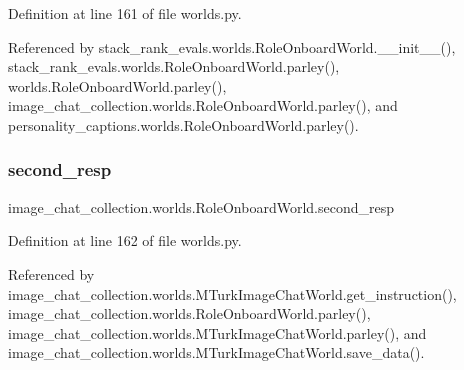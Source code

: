 Definition at line 161 of file worlds.\+py.



Referenced by stack\+\_\+rank\+\_\+evals.\+worlds.\+Role\+Onboard\+World.\+\_\+\+\_\+init\+\_\+\+\_\+(), stack\+\_\+rank\+\_\+evals.\+worlds.\+Role\+Onboard\+World.\+parley(), worlds.\+Role\+Onboard\+World.\+parley(), image\+\_\+chat\+\_\+collection.\+worlds.\+Role\+Onboard\+World.\+parley(), and personality\+\_\+captions.\+worlds.\+Role\+Onboard\+World.\+parley().

\mbox{\label{classimage__chat__collection_1_1worlds_1_1RoleOnboardWorld_aae14ab21837d108894456e35c150f1fa}} 
\subsubsection{\texorpdfstring{second\+\_\+resp}{second\_resp}}
{\footnotesize\ttfamily image\+\_\+chat\+\_\+collection.\+worlds.\+Role\+Onboard\+World.\+second\+\_\+resp}



Definition at line 162 of file worlds.\+py.



Referenced by image\+\_\+chat\+\_\+collection.\+worlds.\+M\+Turk\+Image\+Chat\+World.\+get\+\_\+instruction(), image\+\_\+chat\+\_\+collection.\+worlds.\+Role\+Onboard\+World.\+parley(), image\+\_\+chat\+\_\+collection.\+worlds.\+M\+Turk\+Image\+Chat\+World.\+parley(), and image\+\_\+chat\+\_\+collection.\+worlds.\+M\+Turk\+Image\+Chat\+World.\+save\+\_\+data().

\mbox{\label{classimage__chat__collection_1_1worlds_1_1RoleOnboardWorld_ad9ed130b4de7849a205afa0d2e0881ab}} 
